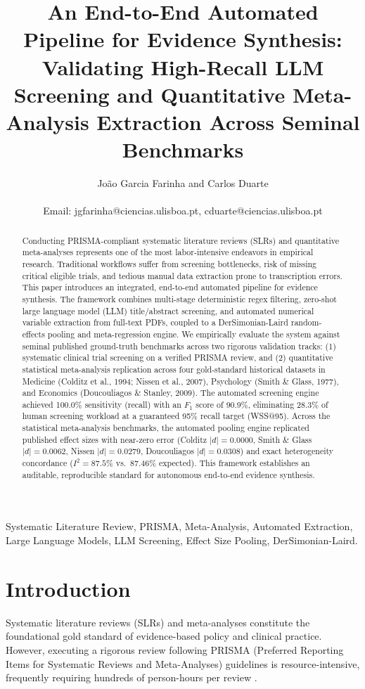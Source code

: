 \documentclass[journal]{IEEEtran}
\title{An End-to-End Automated Pipeline for Evidence Synthesis: Validating High-Recall LLM Screening and Quantitative Meta-Analysis Extraction Across Seminal Benchmarks}
\author{João Garcia Farinha and Carlos Duarte\\
\IEEEmembership{LASIGE, Faculdade de Ciências, Universidade de Lisboa, Portugal}\\
Email: jgfarinha@ciencias.ulisboa.pt, cduarte@ciencias.ulisboa.pt}
\begin{document}
\maketitle

\begin{abstract}
Conducting PRISMA-compliant systematic literature reviews (SLRs) and quantitative meta-analyses represents one of the most labor-intensive endeavors in empirical research. Traditional workflows suffer from screening bottlenecks, risk of missing critical eligible trials, and tedious manual data extraction prone to transcription errors. This paper introduces an integrated, end-to-end automated pipeline for evidence synthesis. The framework combines multi-stage deterministic regex filtering, zero-shot large language model (LLM) title/abstract screening, and automated numerical variable extraction from full-text PDFs, coupled to a DerSimonian-Laird random-effects pooling and meta-regression engine. We empirically evaluate the system against seminal published ground-truth benchmarks across two rigorous validation tracks: (1) systematic clinical trial screening on a verified PRISMA review, and (2) quantitative statistical meta-analysis replication across four gold-standard historical datasets in Medicine (Colditz et al., 1994; Nissen et al., 2007), Psychology (Smith \& Glass, 1977), and Economics (Doucouliagos \& Stanley, 2009). The automated screening engine achieved 100.0\% sensitivity (recall) with an $F_1$ score of 90.9\%, eliminating 28.3\% of human screening workload at a guaranteed 95\% recall target (WSS@95). Across the statistical meta-analysis benchmarks, the automated pooling engine replicated published effect sizes with near-zero error (Colditz $|d| = 0.0000$, Smith \& Glass $|d| = 0.0062$, Nissen $|d| = 0.0279$, Doucouliagos $|d| = 0.0308$) and exact heterogeneity concordance ($I^2 = 87.5\%$ vs.\ 87.46\% expected). This framework establishes an auditable, reproducible standard for autonomous end-to-end evidence synthesis.
\end{abstract}

\begin{IEEEkeywords}
Systematic Literature Review, PRISMA, Meta-Analysis, Automated Extraction, Large Language Models, LLM Screening, Effect Size Pooling, DerSimonian-Laird.
\end{IEEEkeywords}

\section{Introduction}
Systematic literature reviews (SLRs) and meta-analyses constitute the foundational gold standard of evidence-based policy and clinical practice. However, executing a rigorous review following PRISMA (Preferred Reporting Items for Systematic Reviews and Meta-Analyses) guidelines is resource-intensive, frequently requiring hundreds of person-hours per review \cite{page2021prisma}.
\end{document}
